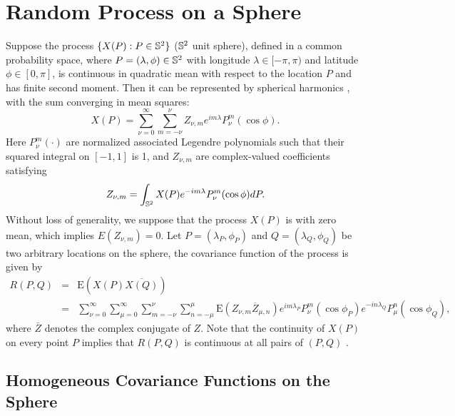 %
%
%



\section{Random Process on a Sphere}
	
Suppose the process $\{X(P): P\in \mathbb{S}^2\}$ ($\mathbb{S}^2$ unit sphere), defined in a common probability space, where $P=(\lambda, \phi) \in \mathbb{S}^2$ with longitude $\lambda \in [-\pi, \pi)$ and latitude $\phi \in [0, \pi]$, is continuous in quadratic mean with respect to the location $P$ and has finite second moment. Then it can be represented by spherical harmonics \citep{Jones1963, LiNorth1997, Huang2012}, with the sum converging in mean squares:
	\[
	X(P) = \sum_{\nu=0}^\infty \sum_{m=-\nu}^{\nu} Z_{\nu,m} e^{i m \lambda} P_{\nu}^m (\cos \phi).
	\]
Here $P_{\nu}^m(\cdot)$ are normalized associated Legendre polynomials such that their squared integral on $[-1, 1]$
is 1, and $Z_{\nu,m}$ are complex-valued coefficients satisfying	
	\[
	Z_{\nu,m} = \int_{\mathbb{S}^2} X(P) e^{-im \lambda} P_{\nu}^m (\cos \phi) d P.
	\]
Without loss of generality, we suppose that the process $X(P)$ is with zero mean, which implies $E(Z_{\nu,m}) = 0$. Let $P = (\lambda_P, \phi_P)$ and $Q=(\lambda_Q, \phi_Q)$ be two arbitrary locations on the sphere, the covariance function of the process is given by
	\begin{eqnarray*} \label{rpq_1}
		R(P, Q) &=& \mbox{E}(X(P) \overline{X(Q)}) \\
		&=& \sum_{\nu=0}^\infty \sum_{\mu=0}^\infty \sum_{m=-\nu}^{\nu} \sum_{n=-\mu}^{\mu} \mbox{E}(Z_{\nu,m} \overline{Z}_{\mu,n}) e^{im \lambda_P} P_{\nu}^m(\cos \phi_P) e^{-i n \lambda_Q} P_{\mu}^n (\cos \phi_Q),
	\end{eqnarray*}
where $\bar{Z}$ denotes the complex conjugate of $Z$. Note that the continuity of $X(P)$ on every point $P$ implies that $R(P, Q)$ is continuous at all pairs of $(P, Q)$ \citep[page 83]{Leadbetter1967}.

	\subsection{Homogeneous Covariance Functions on the Sphere}
	
